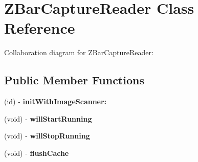 \hypertarget{interface_z_bar_capture_reader}{
\section{ZBarCaptureReader Class Reference}
\label{interface_z_bar_capture_reader}
}


Collaboration diagram for ZBarCaptureReader:
\subsection*{Public Member Functions}
\begin{DoxyCompactItemize}
\item 
\hypertarget{interface_z_bar_capture_reader_a72181a1584273ba77becf6dffc20ff53}{
(id) -\/ {\bfseries initWithImageScanner:}}
\label{interface_z_bar_capture_reader_a72181a1584273ba77becf6dffc20ff53}

\item 
\hypertarget{interface_z_bar_capture_reader_a5c68a2b424d1af86c359fca33b4ba66d}{
(void) -\/ {\bfseries willStartRunning}}
\label{interface_z_bar_capture_reader_a5c68a2b424d1af86c359fca33b4ba66d}

\item 
\hypertarget{interface_z_bar_capture_reader_ae487ddb914d39af859bf5672d7526a8a}{
(void) -\/ {\bfseries willStopRunning}}
\label{interface_z_bar_capture_reader_ae487ddb914d39af859bf5672d7526a8a}

\item 
\hypertarget{interface_z_bar_capture_reader_aceb3fa9802c8a614e566ca673a73c3fb}{
(void) -\/ {\bfseries flushCache}}
\label{interface_z_bar_capture_reader_aceb3fa9802c8a614e566ca673a73c3fb}

\end{DoxyCompactItemize}
